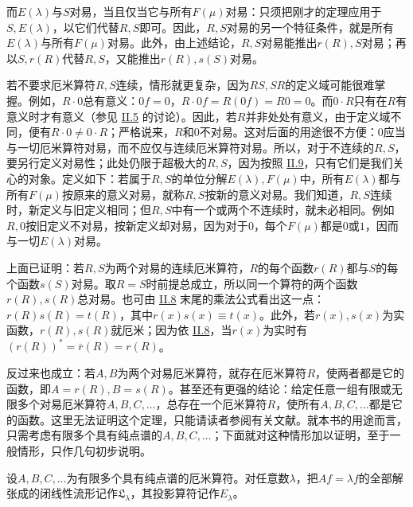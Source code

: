 \documentclass[fontsize=13pt,twoside,openany,headings=normal,parskip=false,bookmarkpackage=false,DIV=calc]{scrbook}
\begin{document}
而$E(\lambda)$与$S$对易，当且仅当它与所有$F(\mu)$对易：只须把刚才的定理应用于$S,\allowbreak E(\lambda)$，以它们代替$R,\allowbreak S$即可。因此，$R,\allowbreak S$对易的另一个特征条件，就是所有$E(\lambda)$与所有$F(\mu)$对易。此外，由上述结论，$R,\allowbreak S$对易能推出$r(R),\allowbreak S$对易；再以$S,\allowbreak r(R)$代替$R,\allowbreak S$，又能推出$r(R),\allowbreak s(S)$对易。

\hypertarget{origpage-90}{}\label{origpage-90}若不要求厄米算符$R,\allowbreak S$连续，情形就更复杂，因为$RS,\allowbreak SR$的定义域可能很难掌握。例如，$R\cdot0$总有意义：$0f=0$，$R\cdot0f=R(0f)=R0=0$。而$0\cdot R$只有在$R$有意义时才有意义（参见 \hyperref[sec:II.5]{II.5} 的讨论）。因此，若$R$并非处处有意义，由于定义域不同，便有$R\cdot0\ne0\cdot R$；严格说来，$R$和$0$不对易。这对后面的用途很不方便：$0$应当与一切厄米算符对易，而不应仅与连续厄米算符对易。所以，对于不连续的$R,\allowbreak S$，要另行定义对易性；此处仍限于超极大的$R,\allowbreak S$，因为按照 \hyperref[sec:II.9]{II.9}，只有它们是我们关心的对象。定义如下：若属于$R,\allowbreak S$的单位分解$E(\lambda),\allowbreak F(\mu)$中，所有$E(\lambda)$都与所有$F(\mu)$按原来的意义对易，就称$R,\allowbreak S$按新的意义对易。我们知道，$R,\allowbreak S$连续时，新定义与旧定义相同；但$R,\allowbreak S$中有一个或两个不连续时，就未必相同。例如$R,\allowbreak 0$按旧定义不对易，按新定义却对易，因为对于$0$，每个$F(\mu)$都是$0$或$1$，因而与一切$E(\lambda)$对易。

上面已证明：若$R,\allowbreak S$为两个对易的连续厄米算符，$R$的每个函数$r(R)$都与$S$的每个函数$s(S)$对易。取$R=S$时前提总成立，所以同一个算符的两个函数$r(R),\allowbreak s(R)$总对易。也可由 \hyperref[sec:II.8]{II.8} 末尾的乘法公式看出这一点：$r(R)s(R)=t(R)$，其中$r(x)s(x)\equiv t(x)$。此外，若$r(x),\allowbreak s(x)$为实函数，$r(R),\allowbreak s(R)$就厄米；因为依 \hyperref[sec:II.8]{II.8}，当$r(x)$为实时有$(r(R))^*=\overline r(R)=r(R)$。

反过来也成立：若$A,\allowbreak B$为两个对易厄米算符，就存在厄米算符$R$，使两者都是它的函数，即$A=r(R),\allowbreak B=s(R)$。甚至还有更强的结论：给定任意一组有限或无限多个对易厄米算符$A,\allowbreak B,\allowbreak C,\allowbreak \ldots$，总存在一个厄米算符$R$，使所有$A,\allowbreak B,\allowbreak C,\allowbreak \ldots$都是它的函数。这里无法证明这个定理，只能请读者参阅有关文献。就本书的用途而言，只需考虑有限多个具有纯点谱的$A,\allowbreak B,\allowbreak C,\allowbreak \ldots$；下面就对这种情形加以证明，至于一般情形，只作几句初步说明。

设$A,\allowbreak B,\allowbreak C,\allowbreak \ldots$为有限多个具有纯点谱的厄米算符。对任意数$\lambda$，把$Af=\lambda f$的全部解张成的闭线性流形记作$\mathfrak L_\lambda$，其投影算符记作$E_\lambda$。
\end{document}
